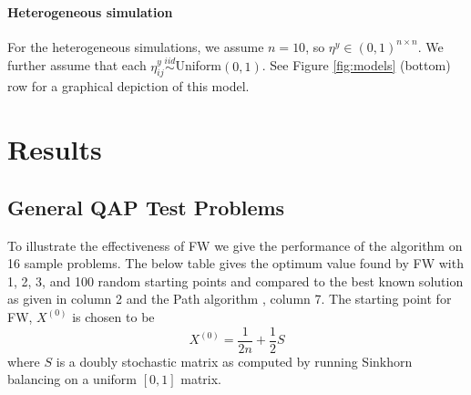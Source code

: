 
\paragraph{Heterogeneous simulation} %
\label{par:homogeneous_kidney_egg_simulation}

For the heterogeneous simulations, we assume $n=10$, so $\eta^y \in (0,1)^{n\times n}$.  We further assume that each $\eta_{ij}^y \overset{iid}{\sim}$Uniform$(0,1)$.  See Figure \ref{fig:models} (bottom) row for a graphical depiction of this model.










\section{Results} %
\label{sec:results}


\subsection{General QAP Test Problems}
To illustrate the effectiveness of FW 
we give the performance of the algorithm on 16 sample problems.  The below table gives the optimum value found by FW with 1, 2, 3, and 100 random starting points   and compared 
to the best known solution as given in column 2 and the Path algorithm  \cite{Path:2009}, column 7.   The starting point for FW, $X^{(0)}$ is chosen to be
$$X^{(0)}=\frac {1}{2n} + \frac{1}{2} S$$
where $S$ is a doubly stochastic matrix as computed by running Sinkhorn balancing on a uniform $[0,1]$ matrix.

